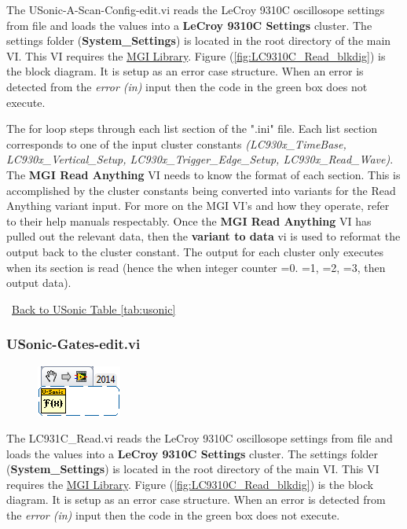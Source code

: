 \documentclass[11pt,a4paper,oldfontcommands]{memoir}
\begin{document}
The USonic-A-Scan-Config-edit.vi reads the LeCroy 9310C oscillosope settings from file and loads the values into a \textbf{LeCroy 9310C Settings} cluster. The settings folder (\textbf{System\_Settings}) is located in the root directory of the main VI. This VI requires the \href{http://sine.ni.com/nips/cds/view/p/lang/en/nid/209753}{MGI Library}. Figure (\ref{fig:LC9310C_Read_blkdig}) is the block diagram.  It is setup as an error case structure. When an error is detected from the \textit{error (in)} input then the code in the green box does not execute.

The for loop steps through each list section of the ".ini" file. Each list section corresponds to one of the input cluster constants \textit{(LC930x\_TimeBase, LC930x\_Vertical\_Setup, LC930x\_Trigger\_Edge\_Setup, LC930x\_Read\_Wave)}. The \textbf{MGI Read Anything} VI needs to know the format of each section. This is accomplished by the cluster constants being converted into variants for the Read Anything variant input.  For more on the MGI VI's and how they operate, refer to their help manuals respectably. Once the \textbf{MGI Read Anything} VI has pulled out the relevant data, then the \textbf{variant to data} vi is used to reformat the output back to the cluster constant. The output for each cluster only executes when its section is read (hence the when integer counter =0. =1, =2, =3, then output data).

\noindent\hrulefill\, \hyperref[tab:usonic]{Back to USonic Table \ref{tab:usonic}}

\subsubsection{USonic-Gates-edit.vi} \label{USonic-Gates}
\noindent\hrulefill

\begin{figure}[h]
	\includegraphics[scale=0.625]{USonic-FFT_main_01}
	\label{fig:USonic-Gates-edit_main_01}
\end{figure}

The LC931C\_Read.vi reads the LeCroy 9310C oscillosope settings from file and loads the values into a \textbf{LeCroy 9310C Settings} cluster. The settings folder (\textbf{System\_Settings}) is located in the root directory of the main VI. This VI requires the \href{http://sine.ni.com/nips/cds/view/p/lang/en/nid/209753}{MGI Library}. Figure (\ref{fig:LC9310C_Read_blkdig}) is the block diagram.  It is setup as an error case structure. When an error is detected from the \textit{error (in)} input then the code in the green box does not execute.
\end{document}
